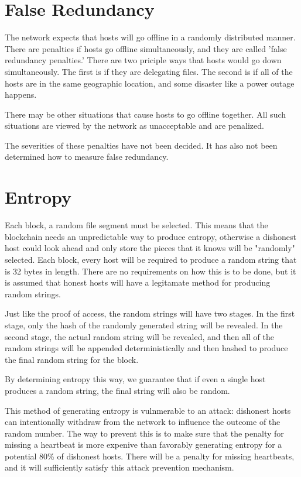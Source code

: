 \documentclass[twocolumn]{article}
\begin{document}
\section{False Redundancy}

The network expects that hosts will go offline in a randomly distributed manner.
There are penalties if hosts go offline simultaneously, and they are called 'false redundancy penalties.'
There are two priciple ways that hosts would go down simultaneously.
The first is if they are delegating files.
The second is if all of the hosts are in the same geographic location, and some disaster like a power outage happens.

There may be other situations that cause hosts to go offline together.
All such situations are viewed by the network as unacceptable and are penalized.

The severities of these penalties have not been decided.
It has also not been determined how to measure false redundancy.

\section{Entropy}

Each block, a random file segment must be selected.
This means that the blockchain needs an unpredictable way to produce entropy, otherwise a dishonest host could look ahead and only store the pieces that it knows will be "randomly" selected.
Each block, every host will be required to produce a random string that is 32 bytes in length.
There are no requirements on how this is to be done, but it is assumed that honest hosts will have a legitamate method for producing random strings.

Just like the proof of access, the random strings will have two stages.
In the first stage, only the hash of the randomly generated string will be revealed.
In the second stage, the actual random string will be revealed, and then all of the random strings will be appended deterministically and then hashed to produce the final random string for the block.

By determining entropy this way, we guarantee that if even a single host produces a random string, the final string will also be random.

This method of generating entropy is vulnmerable to an attack: dishonest hosts can intentionally withdraw from the network to influence the outcome of the random number.
The way to prevent this is to make sure that the penalty for missing a heartbeat is more expenive than favorably generating entropy for a potential 80\% of dishonest hosts.
There will be a penalty for missing heartbeats, and it will sufficiently satisfy this attack prevention mechanism.
\end{document}
